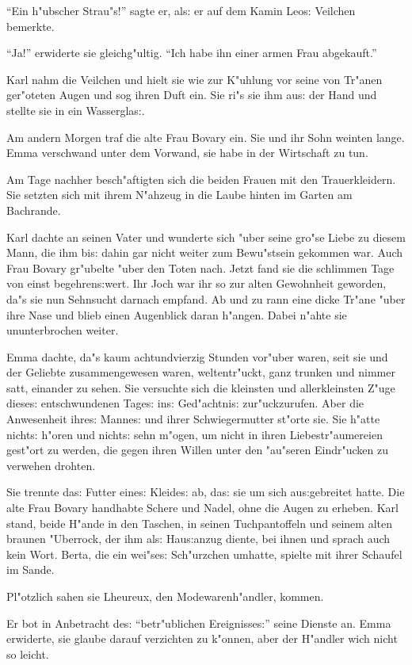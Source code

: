 \documentclass[oneside,12pt]{book}
\newcommand{\s}{s:}%
\begin{document}
"`Ein h"ubscher Strau"s!"' sagte er, al{\s} er auf dem Kamin
Leo{\s} Veilchen bemerkte.

"`Ja!"' erwiderte sie gleichg"ultig. "`Ich habe ihn einer armen
Frau abgekauft."'

Karl nahm die Veilchen und hielt sie wie zur K"uhlung vor seine
von Tr"anen ger"oteten Augen und sog ihren Duft ein. Sie ri"s sie
ihm au{\s} der Hand und stellte sie in ein Wassergla{\s}.

Am andern Morgen traf die alte Frau Bovary ein. Sie und ihr Sohn
weinten lange. Emma verschwand unter dem Vorwand, sie habe in der
Wirtschaft zu tun.

Am Tage nachher besch"aftigten sich die beiden Frauen mit den
Trauerkleidern. Sie setzten sich mit ihrem N"ahzeug in die Laube
hinten im Garten am Bachrande.

Karl dachte an seinen Vater und wunderte sich "uber seine gro"se
Liebe zu diesem Mann, die ihm bi{\s} dahin gar nicht weiter zum
Bewu"stsein gekommen war. Auch Frau Bovary gr"ubelte "uber den
Toten nach. Jetzt fand sie die schlimmen Tage von einst
begehren{\s}wert. Ihr Joch war ihr so zur alten Gewohnheit
geworden, da"s sie nun Sehnsucht darnach empfand. Ab und zu rann
eine dicke Tr"ane "uber ihre Nase und blieb einen Augenblick daran
h"angen. Dabei n"ahte sie ununterbrochen weiter.

Emma dachte, da"s kaum achtundvierzig Stunden vor"uber waren, seit
sie und der Geliebte zusammengewesen waren, weltentr"uckt, ganz
trunken und nimmer satt, einander zu sehen. Sie versuchte sich die
kleinsten und allerkleinsten Z"uge diese{\s} entschwundenen
Tage{\s} in{\s} Ged"achtni{\s} zur"uckzurufen. Aber die Anwesenheit
ihre{\s} Manne{\s} und ihrer Schwiegermutter st"orte sie. Sie
h"atte nicht{\s} h"oren und nicht{\s} sehn m"ogen, um nicht in
ihren Liebestr"aumereien gest"ort zu werden, die gegen ihren
Willen unter den "au"seren Eindr"ucken zu verwehen drohten.

Sie trennte da{\s} Futter eine{\s} Kleide{\s} ab, da{\s} sie um
sich au{\s}gebreitet hatte. Die alte Frau Bovary handhabte Schere
und Nadel, ohne die Augen zu erheben. Karl stand, beide H"ande in
den Taschen, in seinen Tuchpantoffeln und seinem alten braunen
"Uberrock, der ihm al{\s} Hau{\s}anzug diente, bei ihnen und
sprach auch kein Wort. Berta, die ein wei"se{\s} Sch"urzchen
umhatte, spielte mit ihrer Schaufel im Sande.

Pl"otzlich sahen sie Lheureux, den Modewarenh"andler, kommen.

Er bot in Anbetracht de{\s} "`betr"ublichen Ereignisse{\s}"' seine
Dienste an. Emma erwiderte, sie glaube darauf verzichten zu
k"onnen, aber der H"andler wich nicht so leicht.
\end{document}
